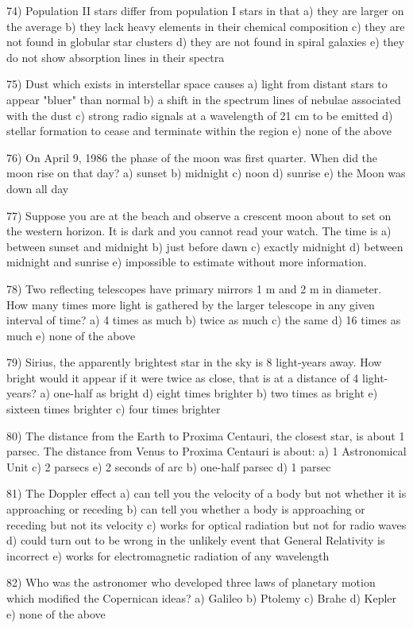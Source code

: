 74) Population II stars differ from population I stars in that
a) they are larger on the average
b) they lack heavy elements in their chemical composition
c) they are not found in globular star clusters
d) they are not found in spiral galaxies
e) they do not show absorption lines in their spectra

75) Dust which exists in interstellar space causes
a) light from distant stars to appear "bluer" than normal
b) a shift in the spectrum lines of nebulae associated with the dust
c) strong radio signals at a wavelength of 21 cm to be emitted
d) stellar formation to cease and terminate within the region
e) none of the above

76) On April 9, 1986 the phase of the moon was first quarter.
When did the moon rise on that day?
a) sunset b) midnight c) noon d) sunrise
e) the Moon was down all day

77) Suppose you are at the beach and observe a crescent moon about to set
on the western horizon. It is dark and you cannot read your watch.
The time is
a) between sunset and midnight b) just before dawn
c) exactly midnight d) between midnight and sunrise
e) impossible to estimate without more information.

78) Two reflecting telescopes have primary mirrors 1 m and 2 m in diameter.
How many times more light is gathered by the larger telescope in any
given interval of time?
a) 4 times as much b) twice as much c) the same d) 16 times as much
e) none of the above

79) Sirius, the apparently brightest star in the sky is 8 light-years away.
How bright would it appear if it were twice as close, that is at a distance
of 4 light-years?
a) one-half as bright d) eight times brighter
b) two times as bright e) sixteen times brighter
c) four times brighter

80) The distance from the Earth to Proxima Centauri, the closest star, is about
1 parsec. The distance from Venus to Proxima Centauri is about:
a) 1 Astronomical Unit c) 2 parsecs e) 2 seconds of arc
b) one-half parsec d) 1 parsec

81) The Doppler effect
a) can tell you the velocity of a body but not whether it is approaching
or receding
b) can tell you whether a body is approaching or receding but not its
velocity
c) works for optical radiation but not for radio waves
d) could turn out to be wrong in the unlikely event that General Relativity
is incorrect
e) works for electromagnetic radiation of any wavelength

82) Who was the astronomer who developed three laws of planetary motion
which modified the Copernican ideas?
a) Galileo b) Ptolemy c) Brahe d) Kepler e) none of the above

